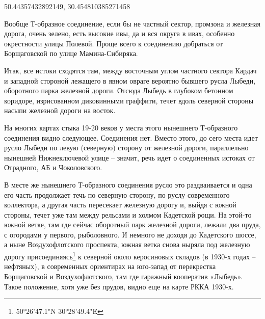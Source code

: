 
50.44357432892149, 30.454810385271458

Вообще Т-образное соединение, если бы не частный сектор, промзона и железная дорога, очень зелено, есть высокие ивы, да и вся округа в ивах, особенно окрестности улицы Полевой. Проще всего к соединению добраться от Борщаговской по улице Мамина-Сибиряка.

Итак, все истоки сходятся там, между восточным углом частного сектора Кардач и западной стороной лежащего в явном овраге вероятно бывшего русла Лыбеди, оборотного парка железной дороги. Отсюда Лыбедь в глубоком бетонном коридоре, изрисованном диковинными граффити, течет вдоль северной стороны насыпи  железной дороги на восток.






На многих картах стыка 19-20 веков у места этого нынешнего Т-образного соединения видно следующее. Соединения нет. Вместо этого, до сего места идет русло Лыбеди по левую (северную) сторону от железной дороги, параллельно нынешней Нижнеключевой улице – значит, речь идет о соединенных истоках от Отрадного, АБ и Чоколовского.

В месте же нынешнего Т-образного соединения русло это раздваивается и одна его часть продолжает течь по северную сторону, по руслу современного коллектора, а другая часть пересекает железную дорогу и, выйдя с южной стороны, течет уже там между рельсами и холмом Кадетской рощи. На этой-то южной ветке, там где сейчас оборотный парк железной дороги, лежали два пруда, с огородами у первого, рыболовного. И немного не доходя до Кадетского шоссе, а ныне Воздухофлотского проспекта, южная ветка снова ныряла под железную дорогу присоединяясь\footnote{50°26'47.1"N 30°28'49.4"E} к северной около керосиновых складов (в 1930-х годах – нефтяных), в современных ориентирах на юго-запад от перекрестка Борщаговской и Воздухофлотского, там где гаражный кооператив «Лыбедь». Такое положение, хотя уже без прудов, видно еще на карте РККА 1930-х.

